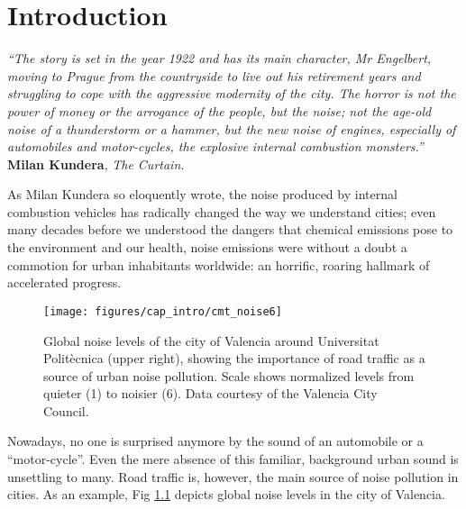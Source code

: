 \chapter{Introduction} \label{cap:intro}

\null\vspace{-10mm}
\begin{flushright}
\begin{minipage}[t]{0.66\textwidth}
{\itshape\small``The story is set in the year 1922 and has its main character, Mr Engelbert, moving to Prague from the countryside to live out his retirement years and struggling to cope with the aggressive modernity of the city. The horror is not the power of money or the arrogance of the people, but the noise; not the age-old noise of a thunderstorm or a hammer, but the new noise of engines, especially of automobiles and motor-cycles, the explosive internal combustion monsters.''}\\[-3mm]

{\cabincondensed\small\hfill \textbf{Milan Kundera}, \emph{The Curtain.}}\\[5mm]
\end{minipage}
\end{flushright}

\noindent As Milan Kundera so eloquently wrote, the noise produced by internal combustion vehicles has radically changed the way we understand cities; even many decades before we understood the dangers that chemical emissions pose to the environment and our health, noise emissions were without a doubt a commotion for urban inhabitants worldwide: an horrific, roaring hallmark of accelerated progress.

\begin{figure}[t!]
\centering
\texttt{[image: figures/cap\_intro/cmt\_noise6]}
\caption{Global noise levels of the city of Valencia around Universitat Politècnica (upper right), showing the importance of road traffic as a source of urban noise pollution. Scale shows normalized levels from quieter (1) to noisier (6). Data courtesy of the Valencia City Council.}
\label{fig:noise_valencia}
\end{figure}

Nowadays, no one is surprised anymore by the sound of an automobile or a ``motor-cycle''. Even the mere absence of this familiar, background urban sound is unsettling to many. Road traffic is, however, the main source of noise pollution in cities. As an example, Fig \ref{fig:noise_valencia} depicts global noise levels in the city of Valencia.


